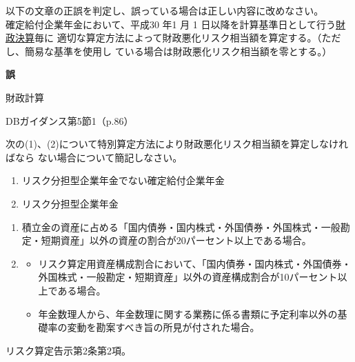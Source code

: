 \begin{truefalse}[年金2 2018 問題1(1)\textcircled{3}]
以下の文章の正誤を判定し、誤っている場合は正しい内容に改めなさい。
\\

  確定給付企業年金において、平成30 年1 月 1 日以降を計算基準日として行う\underline{財政決算}毎に
適切な算定方法によって財政悪化リスク相当額を算定する。（ただし、簡易な基準を使用し
ている場合は財政悪化リスク相当額を零とする。）
\end{truefalse}

\begin{answerbox}
  \textbf{誤}

  財政計算
\end{answerbox}

\begin{explanationbox}
  DBガイダンス第5節1（p.86）
\end{explanationbox}

\begin{shortanswer}[年金2 2018 問題2(1)\textcircled{1}]
  次の(1)、(2)について特別算定方法により財政悪化リスク相当額を算定しなければなら
ない場合について簡記しなさい。

\begin{enumerate}[(1)]
  \item リスク分担型企業年金でない確定給付企業年金
  \item リスク分担型企業年金
\end{enumerate}
\end{shortanswer}

\begin{answerbox}
  \begin{enumerate}[(1)]
    \item 積立金の資産に占める「国内債券・国内株式・外国債券・外国株式・一般勘定・短期資産」以外の資産の割合が20パーセント以上である場合。
    \item \begin{itemize}
      \item リスク算定用資産構成割合において、「国内債券・国内株式・外国債券・外国株式・一般勘定・短期資産」以外の資産構成割合が10パーセント以上である場合。
      \item 年金数理人から、年金数理に関する業務に係る書類に予定利率以外の基礎率の変動を勘案すべき旨の所見が付された場合。
    \end{itemize}
  \end{enumerate}
\end{answerbox}

\begin{explanationbox}
  リスク算定告示第2条第2項。
\end{explanationbox}


